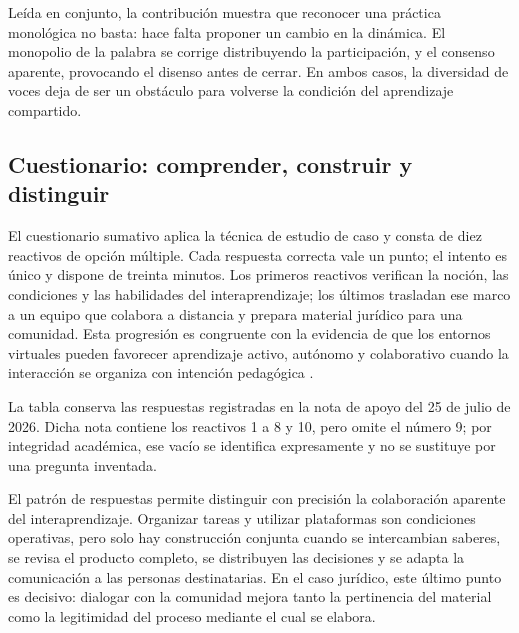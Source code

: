 \documentclass[
  spanish,
  letterpaper, oneside
]{article}
\begin{document}
Leída en conjunto, la contribución muestra que reconocer una práctica monológica no
basta: hace falta proponer un cambio en la dinámica. El monopolio de la palabra se
corrige distribuyendo la participación, y el consenso aparente, provocando el
disenso antes de cerrar. En ambos casos, la diversidad de voces deja de ser un
obstáculo para volverse la condición del aprendizaje compartido.

\subsection{Cuestionario: comprender, construir y distinguir}

El cuestionario sumativo aplica la técnica de estudio de caso y consta de diez
reactivos de opción múltiple. Cada respuesta correcta vale un punto; el intento es
único y dispone de treinta minutos. Los primeros reactivos verifican la noción, las
condiciones y las habilidades del interaprendizaje; los últimos trasladan ese marco a
un equipo que colabora a distancia y prepara material jurídico para una comunidad.
Esta progresión es congruente con la evidencia de que los entornos virtuales pueden
favorecer aprendizaje activo, autónomo y colaborativo cuando la interacción se
organiza con intención pedagógica \citep{cushpa2022pacie,silva2015metodologias}.

La tabla conserva las respuestas registradas en la nota de apoyo del 25 de julio de
2026. Dicha nota contiene los reactivos 1 a 8 y 10, pero omite el número 9; por
integridad académica, ese vacío se identifica expresamente y no se sustituye por una
pregunta inventada.

El patrón de respuestas permite distinguir con precisión la colaboración aparente del
interaprendizaje. Organizar tareas y utilizar plataformas son condiciones operativas,
pero solo hay construcción conjunta cuando se intercambian saberes, se revisa el
producto completo, se distribuyen las decisiones y se adapta la comunicación a las
personas destinatarias. En el caso jurídico, este último punto es decisivo: dialogar
con la comunidad mejora tanto la pertinencia del material como la legitimidad del
proceso mediante el cual se elabora.
\end{document}
